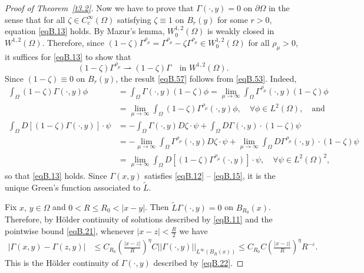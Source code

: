 \documentclass[12pt,reqno]{amsart}
\theoremstyle{plain}
\theoremstyle{definition}
\newenvironment{pf}
{\begin{proof}} {\end{proof}}
\newcommand{\eps}{\varepsilon}
\newcommand{\Ga}{\Gamma}
\newcommand{\Om}{\Omega}
\newcommand{\iny}{\infty}
\newcommand{\del}{ \partial}
\newcommand{\norm}[1]{\left\vert \left\vert #1\right\vert\right\vert}
\newcommand{\abs}[1]{\left\vert#1\right\vert}
\newcommand{\brac}[1]{\left[#1\right]}
\newcommand{\pr}[1]{\left( #1 \right) }
\begin{document}
\begin{appendix}
\begin{pf}[Proof of Theorem~\ref{t3.2}]
Now we have to prove that $\Ga(\cdot, y)= 0$ on $\del \Om$ in the sense that for all $\zeta \in C_c^\iny\pr{\Om}$ satisfying $\zeta\equiv 1$ on $B_r(y)$ for some $r>0$, equation \eqref{eqB.13} holds.
By Mazur's lemma, $W^{1,2}_0\pr{\Om}$ is weakly closed in $W^{1,2}\pr{\Om}$.  
Therefore, since $(1-\zeta)\Ga^{\rho_{\mu}}= \Ga^{\rho_{\mu}}- \zeta \Ga^{\rho_{\mu}}  \in W^{1,2}_0\pr{\Om}$ for all $\rho_\mu > 0$, it suffices for \eqref{eqB.13} to show that
\begin{equation}
\label{eqB.57}
(1-\zeta)\Ga^{\rho_\mu} \rightharpoonup (1-\zeta) \Ga \quad \text{in } W^{1,2}\pr{\Om}.
\end{equation}
Since $(1-\zeta)\equiv 0$ on $B_r(y)$, the result \eqref{eqB.57} follows from 
\eqref{eqB.53}.  
Indeed,
\begin{align*}
\int_{\Om} (1-\zeta) \Ga(\cdot, y)\phi 
&=\int_{\Om} \Ga (\cdot, y)(1-\zeta) \phi 
= \lim_{\mu\to \iny} \int_{\Om} \Ga^{\rho_\mu}(\cdot, y) (1-\zeta) \phi \\
&=\lim_{\mu\to \iny} \int_{\Om} (1-\zeta) \Ga^{\rho_\mu} (\cdot, y) \phi, \quad 
\forall \phi \in L^{2}\pr{\Om}, \quad \text{and} \\
\int_{\Om} D\brac{\pr{1-\zeta}\Ga(\cdot, y)}\cdot \psi 
&= -\int_{\Om} \Ga(\cdot, y) D\zeta \cdot \psi + \int_{\Om} D\Ga(\cdot, y) \cdot (1-\zeta)\psi \\
&=-\lim_{\mu\to \iny} \int_{\Om} \Ga^{\rho_\mu} (\cdot, y) D\zeta \cdot \psi + \lim_{\mu \to \iny} \int_{\Om} D\Ga^{\rho_\mu} (\cdot, y) \cdot (1-\zeta) \psi \\
&=\lim_{\mu \to \iny} \int_{\Om} D\brac{\pr{1-\zeta}\Ga^{\rho_\mu} (\cdot, y)}\cdot \psi, \quad 
\forall \psi \in L^2\pr{\Om}^2,
\end{align*}
so that \eqref{eqB.13} holds.
Since $\Ga(x,y)$ satisfies \eqref{eqB.12} -- \eqref{eqB.15}, it is the unique Green's function associated to $\widetilde{L}$.

Fix $x, \, y \in \Om$ and $0<R\le R_0< |x-y|$.  
Then $\widetilde{L}\Ga\pr{\cdot, y}=0$ on $B_{R_0}\pr{x}$.  
Therefore, by H\"older continuity of solutions described by \eqref{eqB.11} and the pointwise bound \eqref{eqB.21}, whenever $\abs{x-z} < \frac{R}{2}$ we have
\begin{align*}
\abs{\Ga\pr{x,y} - \Ga\pr{z,y}} 
&\le C_{R_0} \pr{\frac{|x-z|}{R}}^\eta C \norm{\Ga(\cdot, y)}_{L^\infty\pr{B_{R}(x)}}
\le C_{R_0} C \pr{\frac{|x-z|}{R}}^\eta R^{-\eps}.
\end{align*}
This is the H\"older continuity of $\Ga(\cdot, y)$ described by \eqref{eqB.22}.


\end{pf}
\end{appendix}
\end{document}
